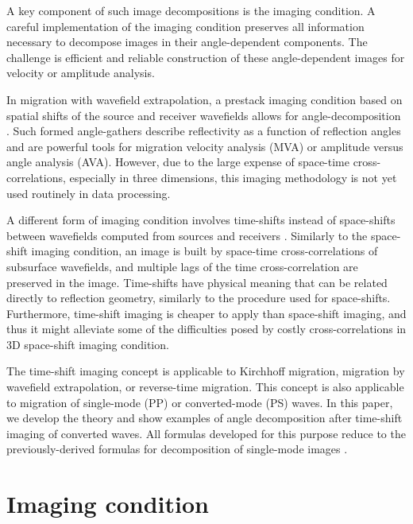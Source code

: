 A key component of such image decompositions
is the imaging condition.
A careful implementation of the imaging condition preserves
all information necessary to decompose images in their
angle-dependent components.
The challenge is efficient and reliable construction of these
angle-dependent images for velocity or amplitude analysis.

In migration with wavefield extrapolation, a prestack imaging condition
based on spatial shifts of the source and receiver wavefields allows
for angle-decomposition
\cite[]{GEO67-03-08830889,SavaFomel.segab2.2005}.
Such formed angle-gathers describe reflectivity as a
function of reflection angles and are powerful tools for migration
velocity analysis (MVA) or amplitude versus angle analysis (AVA).
However, due to the large expense of space-time
cross-correlations, especially in three dimensions,
this imaging methodology is not yet used routinely in data processing.

A different form of imaging condition involves
time-shifts instead of space-shifts
between wavefields computed from sources and receivers
\cite[]{SavaFomel.geo.tsic}.
Similarly to the space-shift imaging condition, an image is built by
space-time cross-correlations of subsurface wavefields,
and multiple lags of the time cross-correlation are preserved in the image.
Time-shifts have physical meaning that can be related directly
to reflection geometry, similarly to the procedure used for
space-shifts.
Furthermore, time-shift imaging is cheaper to apply than space-shift
imaging, and thus it might alleviate some of the difficulties
posed by costly cross-correlations in 3D space-shift imaging condition.

The time-shift imaging concept is applicable to Kirchhoff
migration, migration by wavefield extrapolation, or
reverse-time migration.
This concept is also applicable to migration of single-mode (PP) or 
converted-mode (PS) waves. In this paper, we develop the theory
and show examples of angle decomposition after time-shift 
imaging of converted waves. All formulas developed for this purpose
reduce to the previously-derived formulas for decomposition of 
single-mode images
\cite[]{SavaFomel.segab2.2005,SavaFomel.geo.tsic}.

\section{Imaging condition}

